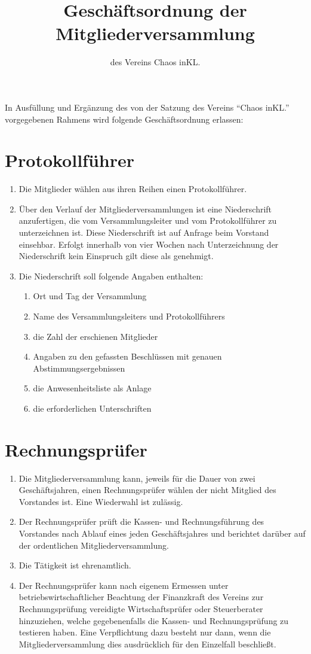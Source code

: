 \documentclass[a4paper, 12pt]{scrartcl}
\title{Geschäftsordnung der Mitgliederversammlung}
\subtitle{des Vereins Chaos inKL.}
\author{}
\date{}
\begin{document}
\maketitle

In Ausfüllung und Ergänzung des von der Satzung des Vereins "`Chaos
inKL."' vorgegebenen Rahmens wird folgende Geschäftsordnung erlassen:

\section{Protokollführer}
\begin{enumerate}
	\item Die Mitglieder wählen aus ihren Reihen einen Protokollführer.
	\item Über den Verlauf der Mitgliederversammlungen ist eine Niederschrift anzufertigen, die vom Versammlungsleiter und vom Protokollführer zu unterzeichnen ist. Diese Niederschrift ist auf Anfrage beim Vorstand einsehbar. Erfolgt innerhalb von vier Wochen nach Unterzeichnung der Niederschrift kein Einspruch gilt diese als genehmigt.
	\item Die Niederschrift soll folgende Angaben enthalten:
		\begin{enumerate}
	  	\item Ort und Tag der Versammlung
	    \item Name des Versammlungsleiters und Protokollführers
	    \item die Zahl der erschienen Mitglieder
	    \item Angaben zu den gefassten Beschlüssen mit genauen Abstimmungsergebnissen
			\item die Anwesenheitsliste als Anlage
	    \item die erforderlichen Unterschriften
		\end{enumerate}
\end{enumerate}

\section{Rechnungsprüfer}
\begin{enumerate}
	\item Die Mitgliederversammlung kann, jeweils für die Dauer von zwei
Geschäftsjahren, einen Rechnungsprüfer wählen der nicht Mitglied des
Vorstandes ist. Eine Wiederwahl ist zulässig.
	\item Der Rechnungsprüfer prüft die Kassen- und Rechnungsführung des
Vorstandes nach Ablauf eines jeden Geschäftsjahres und berichtet darüber
auf der ordentlichen Mitgliederversammlung.
	\item Die Tätigkeit ist ehrenamtlich.
	\item Der Rechnungsprüfer kann nach eigenem Ermessen unter
betriebswirtschaftlicher Beachtung der Finanzkraft des Vereins zur
Rechnungsprüfung vereidigte Wirtschaftsprüfer oder Steuerberater
hinzuziehen, welche gegebenenfalls die Kassen- und Rechnungsprüfung zu
testieren haben. Eine Verpflichtung dazu besteht nur dann, wenn die
Mitgliederversammlung dies ausdrücklich für den Einzelfall beschließt.
\end{enumerate}
\end{document}

